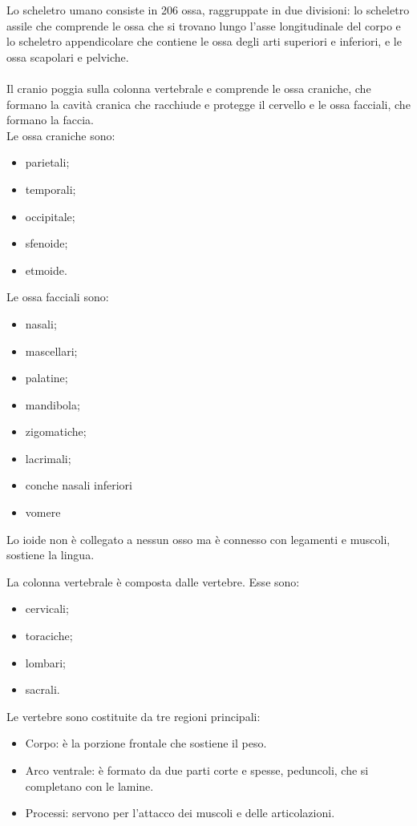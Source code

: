 \documentclass[a4paper]{article}
\begin{document}
Lo scheletro umano consiste in 206 ossa, raggruppate in due divisioni:
lo scheletro assile che comprende le ossa che si trovano lungo l’asse 
longitudinale del corpo e lo scheletro appendicolare che contiene le ossa 
degli arti superiori e inferiori, e le ossa scapolari e pelviche.
\\ \\
Il cranio poggia sulla colonna vertebrale e comprende le ossa craniche, che 
formano la cavità cranica che racchiude e protegge il cervello e le ossa 
facciali, che formano la faccia.
\\
Le ossa craniche sono:
\begin{itemize}
    \item parietali;
    \item temporali;
    \item occipitale;
    \item sfenoide;
    \item etmoide.    
\end{itemize}
Le ossa facciali sono:
\begin{itemize}
\item nasali;
\item mascellari;
\item palatine;
\item mandibola;
\item zigomatiche;
\item lacrimali;
\item conche nasali inferiori
\item vomere
\end{itemize}

Lo ioide non è collegato a nessun osso ma è connesso con legamenti e muscoli,
sostiene la lingua.

La colonna vertebrale è composta dalle vertebre. Esse sono:
\begin{itemize}
\item cervicali;
\item toraciche;
\item lombari;
\item sacrali.
\end{itemize}

Le vertebre sono costituite da tre regioni principali:
\begin{itemize}
    \item Corpo: è la porzione frontale che sostiene il peso.
    \item Arco ventrale: è formato da due parti corte e spesse, peduncoli, che si completano con le lamine.
    \item Processi: servono per l’attacco dei muscoli e delle articolazioni.    
\end{itemize}
\end{document}
